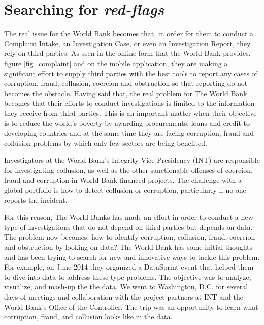 \section{Searching for \textit{red-flags}}

The real issue for the World Bank becomes that, in order for them to conduct a Complaint Intake, an Investigation Case, or even an Investigation Report, they rely on third parties. As seen in the online form that the World Bank provides, figure  \ref{fig_complaint} and on the mobile application, they are making a significant effort to supply third parties with the best tools to report any cases of corruption, fraud, collusion, coercion and  obstruction so that reporting do not becomes the obstacle. Having said that, the real problem for The World Bank becomes that their efforts to conduct investigations is limited to the information they receive from third parties. This is an important matter when their objective is to reduce the world's poverty by awarding procurements, loans and credit to developing countries and at the same time they are facing corruption, fraud and collusion problems by which only few sectors are being benefited.

Investigators at the World Bank's Integrity Vice Presidency (INT) are responsible for investigating collusion, as well as the other sanctionable offenses of coercion, fraud and corruption in World Bank-financed projects. The challenge with a global portfolio is how to detect collusion or corruption, particularly if no one reports the incident.

For this reason, The World Banks has made an effort in order to conduct a new type of investigations that do not depend on third parties but depends on data. The problem now becomes: how to identify corruption, collusion, fraud, coercion and obstruction by looking on data? The World Bank has some initial thoughts and has been trying to search for new and innovative ways to tackle this problem. For example, on June 2014 they organized a DataSprint event that helped them to dive into data to address these type problems. The objective was to analyze, visualize, and mash-up the the data. We went to Washington, D.C. for several days of meetings and collaboration with the project partners at INT and the World Bank's Office of the Controller. The trip was an opportunity to learn what corruption, fraud, and collusion looks like in the data.

